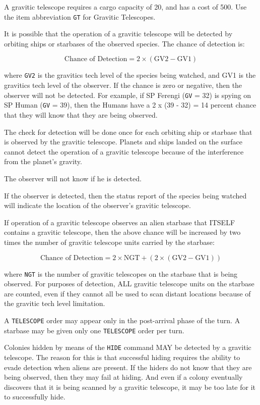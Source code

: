 \documentclass[10pt,titlepage]{article}
\begin{document}
A gravitic telescope requires a cargo capacity of 20, and has a cost of 500.
Use the item abbreviation \texttt{GT} for Gravitic Telescopes.

It is possible that the operation of a gravitic telescope will be detected by
orbiting ships or starbases of the observed species.  The chance of detection
is:

\[
		\textrm{Chance of Detection}  =  2  \times  (\textrm{GV2}  -  \textrm{GV1})
\]

where \texttt{GV2} is the gravitics tech level of the species being watched, and GV1 is
the gravitics tech level of the observer.  If the chance is zero or negative,
then the observer will not be detected.  For example, if SP Ferengi (\texttt{GV} = 32)
is spying on SP Human (\texttt{GV} = 39), then the Humans have a 2 x (39 - 32) = 14
percent chance that they will know that they are being observed.

The check for detection will be done once for each orbiting ship or starbase
that is observed by the gravitic telescope.  Planets and ships landed on the
surface cannot detect the operation of a gravitic telescope because of the
interference from the planet's gravity.

The observer will not know if he is detected.

If the observer is detected, then the status report of the species being
watched will indicate the location of the observer's gravitic telescope.

If operation of a gravitic telescope observes an alien starbase that ITSELF
contains a gravitic telescope, then the above chance will be increased by two
times the number of gravitic telescope units carried by the starbase:

\[
	\textrm{Chance of Detection}  =  2 \times \textrm{NGT}  +  (2  \times  (\textrm{GV2}  -  \textrm{GV1}))
\]

where \texttt{NGT} is the number of gravitic telescopes on the starbase that is being
observed.  For purposes of detection, ALL gravitic telescope units on the
starbase are counted, even if they cannot all be used to scan distant locations
because of the gravitic tech level limitation.

A \texttt{TELESCOPE} order may appear only in the post-arrival phase of the turn.  A
starbase may be given only one \texttt{TELESCOPE} order per turn.

Colonies hidden by means of the \texttt{HIDE} command MAY be detected by a gravitic
telescope.  The reason for this is that successful hiding requires the ability
to evade detection when aliens are present.  If the hiders do not know that
they are being observed, then they may fail at hiding.  And even if a colony
eventually discovers that it is being scanned by a gravitic telescope, it may
be too late for it to successfully hide.
\end{document}
